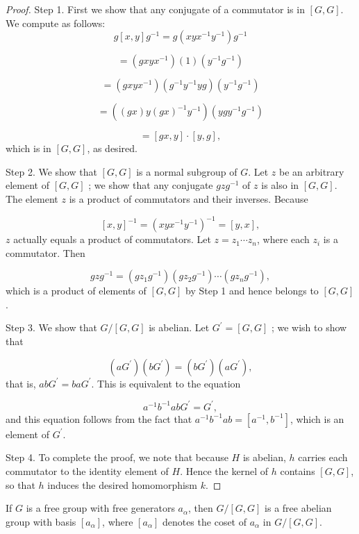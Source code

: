 \begin{proof}
Step 1. First we show that any conjugate of a commutator is in \([ {G,G}]\). We compute as follows:
\[
g[ {x,y}] g^{-1} = g( {{xy}x^{-1}y^{-1}}) g^{-1}
\]

\[
= ( {{gxy}x^{-1}}) (1) ( {y^{-1}g^{-1}})
\]

\[
= ( {{gxy}x^{-1}}) ( {g^{-1}y^{-1}{yg}}) ( {y^{-1}g^{-1}})
\]

\[
= ( {( {gx}) y{( gx) }^{-1}y^{-1}}) ( {{yg}y^{-1}g^{-1}})
\]

\[
= [ {{gx},y}] \cdot [ {y,g}] ,
\]
which is in \([ {G,G}]\), as desired.

Step 2. We show that \([ {G,G}]\) is a normal subgroup of \(G\). Let \(z\) be an arbitrary element of \([ {G,G}]\) ; we show that any conjugate \({gz}g^{-1}\) of \(z\) is also in \([ {G,G}]\). The element \(z\) is a product of commutators and their inverses. Because

\[
{[ x,y] }^{-1} = {( xyx^{-1}y^{-1}) }^{-1} = [ {y,x}] ,
\]
\(z\) actually equals a product of commutators. Let \(z = z_{1}\cdots {z}_{n}\), where each \(z_{i}\) is a commutator. Then

\[
{gz}g^{-1} = ( {gz_{1}g^{-1}}) ( {gz_{2}g^{-1}}) \cdots ( {gz_{n}g^{-1}}),
\]
which is a product of elements of \([ {G,G}]\) by Step 1 and hence belongs to \([ {G,G}]\).

Step 3. We show that \(G/[ {G,G}]\) is abelian. Let \(G^{\prime } = [ {G,G}]\) ; we wish to show that

\[
( {aG^{\prime }}) ( {bG^{\prime }}) = ( {bG^{\prime }}) ( {aG^{\prime }}),
\]
that is, \({ab}G^{\prime } = {ba}G^{\prime }\). This is equivalent to the equation

\[
a^{-1}b^{-1}{ab}G^{\prime } = G^{\prime },
\]
and this equation follows from the fact that \(a^{-1}b^{-1}{ab} = [ {a^{-1},b^{-1}}]\), which is an element of \(G^{\prime }\).

Step 4. To complete the proof, we note that because \(H\) is abelian, \(h\) carries each commutator to the identity element of \(H\). Hence the kernel of \(h\) contains \([ {G,G}]\), so that \(h\) induces the desired homomorphism \(k\).
\end{proof}
\begin{theorem}
\label{thm:\thetheorem}
If \(G\) is a free group with free generators \(a_{\alpha }\), then \(G/[ {G,G}]\) is a free abelian group with basis \([ a_{\alpha }]\), where \([ a_{\alpha }]\) denotes the coset of \(a_{\alpha }\) in \(G/[ {G,G}]\).
\end{theorem}

